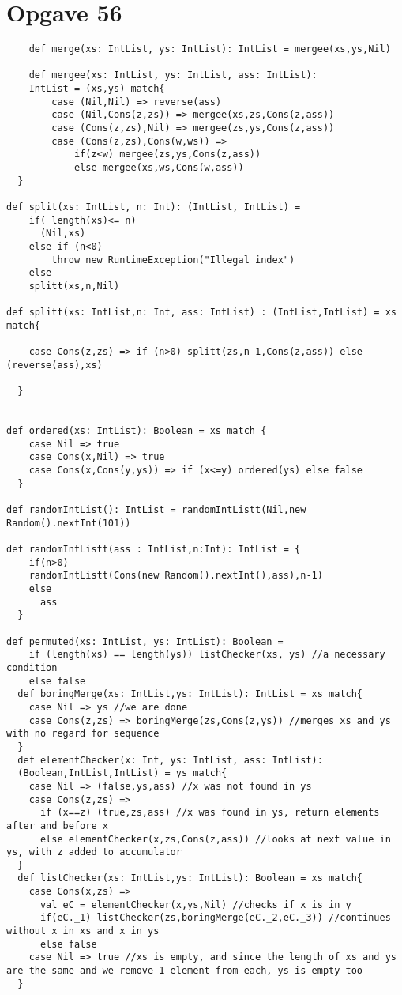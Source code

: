 \documentclass[a4paper, 10pt]{article}
\begin{document}
\section*{Opgave 56}
\begin{lstlisting}
    def merge(xs: IntList, ys: IntList): IntList = mergee(xs,ys,Nil)
    
    def mergee(xs: IntList, ys: IntList, ass: IntList):
    IntList = (xs,ys) match{
        case (Nil,Nil) => reverse(ass)
        case (Nil,Cons(z,zs)) => mergee(xs,zs,Cons(z,ass))
        case (Cons(z,zs),Nil) => mergee(zs,ys,Cons(z,ass))
        case (Cons(z,zs),Cons(w,ws)) =>
            if(z<w) mergee(zs,ys,Cons(z,ass))
            else mergee(xs,ws,Cons(w,ass))
  }

def split(xs: IntList, n: Int): (IntList, IntList) =
    if( length(xs)<= n)
      (Nil,xs)
    else if (n<0)
        throw new RuntimeException("Illegal index")
    else
    splitt(xs,n,Nil)

def splitt(xs: IntList,n: Int, ass: IntList) : (IntList,IntList) = xs match{

    case Cons(z,zs) => if (n>0) splitt(zs,n-1,Cons(z,ass)) else (reverse(ass),xs)

  }


def ordered(xs: IntList): Boolean = xs match {
    case Nil => true
    case Cons(x,Nil) => true
    case Cons(x,Cons(y,ys)) => if (x<=y) ordered(ys) else false
  }

def randomIntList(): IntList = randomIntListt(Nil,new Random().nextInt(101))

def randomIntListt(ass : IntList,n:Int): IntList = {
    if(n>0)
    randomIntListt(Cons(new Random().nextInt(),ass),n-1)
    else
      ass
  }

def permuted(xs: IntList, ys: IntList): Boolean =
    if (length(xs) == length(ys)) listChecker(xs, ys) //a necessary condition
    else false
  def boringMerge(xs: IntList,ys: IntList): IntList = xs match{
    case Nil => ys //we are done
    case Cons(z,zs) => boringMerge(zs,Cons(z,ys)) //merges xs and ys with no regard for sequence
  }
  def elementChecker(x: Int, ys: IntList, ass: IntList):
  (Boolean,IntList,IntList) = ys match{
    case Nil => (false,ys,ass) //x was not found in ys
    case Cons(z,zs) =>
      if (x==z) (true,zs,ass) //x was found in ys, return elements after and before x
      else elementChecker(x,zs,Cons(z,ass)) //looks at next value in ys, with z added to accumulator
  }
  def listChecker(xs: IntList,ys: IntList): Boolean = xs match{
    case Cons(x,zs) =>
      val eC = elementChecker(x,ys,Nil) //checks if x is in y
      if(eC._1) listChecker(zs,boringMerge(eC._2,eC._3)) //continues without x in xs and x in ys
      else false
    case Nil => true //xs is empty, and since the length of xs and ys are the same and we remove 1 element from each, ys is empty too
  }


\end{lstlisting}
\end{document}
